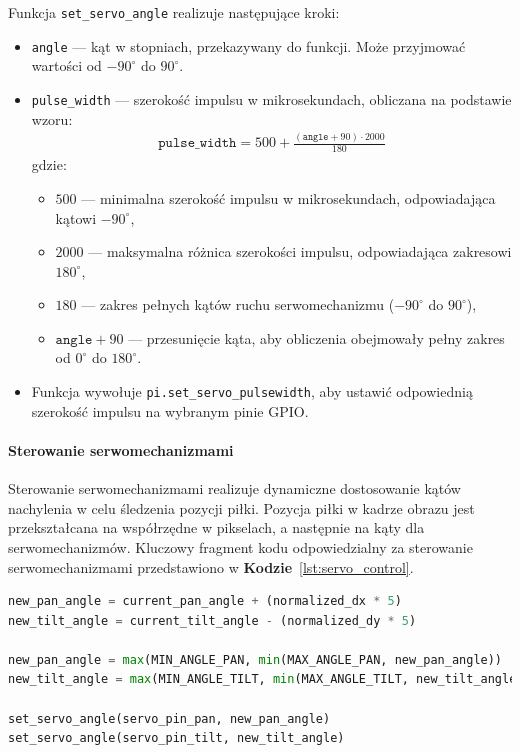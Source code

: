 \documentclass[a4paper,twoside,12pt]{book}
\begin{document}
\newpage
Funkcja \texttt{set\_servo\_angle} realizuje następujące kroki:
\begin{itemize}
    \item \texttt{angle} — kąt w stopniach, przekazywany do funkcji. Może przyjmować wartości od $-90^{\circ}$ do $90^{\circ}$.
    \item \texttt{pulse\_width} — szerokość impulsu w mikrosekundach, obliczana na podstawie wzoru:
    \begin{align}
    \texttt{pulse\_width} = 500 + \frac{(\texttt{angle} + 90) \cdot 2000}{180}
    \end{align}
    gdzie:
    \begin{itemize}
        \item $500$ — minimalna szerokość impulsu w mikrosekundach, odpowiadająca kątowi $-90^{\circ}$,
        \item $2000$ — maksymalna różnica szerokości impulsu, odpowiadająca zakresowi $180^{\circ}$,
        \item $180$ — zakres pełnych kątów ruchu serwomechanizmu ($-90^{\circ}$ do $90^{\circ}$),
        \item $\texttt{angle} + 90$ — przesunięcie kąta, aby obliczenia obejmowały pełny zakres od $0^{\circ}$ do $180^{\circ}$.
    \end{itemize}
    \item Funkcja wywołuje \texttt{pi.set\_servo\_pulsewidth}, aby ustawić odpowiednią szerokość impulsu na wybranym pinie GPIO.
\end{itemize}

\paragraph{Sterowanie serwomechanizmami}
Sterowanie serwomechanizmami realizuje dynamiczne dostosowanie kątów nachylenia w celu śledzenia pozycji piłki. Pozycja piłki w kadrze obrazu jest przekształcana na współrzędne w pikselach, a następnie na kąty dla serwomechanizmów. Kluczowy fragment kodu odpowiedzialny za sterowanie serwomechanizmami przedstawiono w \textbf{Kodzie}~\ref{lst:servo_control}.

\begin{lstlisting}[language=Python, caption={Algorytm sterowania serwomechanizmami.}, label={lst:servo_control}, captionpos=b]
new_pan_angle = current_pan_angle + (normalized_dx * 5)
new_tilt_angle = current_tilt_angle - (normalized_dy * 5)

new_pan_angle = max(MIN_ANGLE_PAN, min(MAX_ANGLE_PAN, new_pan_angle))
new_tilt_angle = max(MIN_ANGLE_TILT, min(MAX_ANGLE_TILT, new_tilt_angle))

set_servo_angle(servo_pin_pan, new_pan_angle)
set_servo_angle(servo_pin_tilt, new_tilt_angle)
\end{lstlisting}
\end{document}
